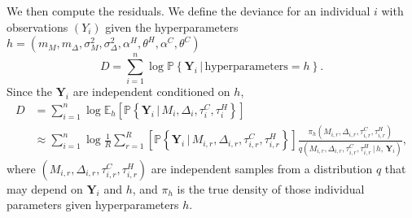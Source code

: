 \documentclass[
]{article}
\begin{document}
We then compute the residuals. We define the deviance for an individual \(i\) with observations \((Y_i)\)
given the hyperparameters \(h=(m_M,m_\Delta,\sigma^2_M,\sigma^2_\Delta,\alpha^H,\theta^H,\alpha^C,\theta^C)\)
\[
  D= \sum_{i=1}^n \log \mathbb{P}\left\{ \mathbf{Y}_{i}\,|\, \text{hyperparameters}=h\right\}.
\]
\newcommand{\wtb}{\widetilde\mathbf}
Since the \(\mathbf{Y}_i\) are independent conditioned on \(h\),
\begin{align*}
D&= \sum_{i=1}^n \log \mathbb{E}_h\left[ \mathbb{P}\left\{ \mathbf{Y}_i \, |\, M_i,\Delta_i,\tau_i^{C},\tau_i^H \right\} \right]\\
    &\approx \sum_{i=1}^n \log \frac1R\sum_{r=1}^R \left[ \mathbb{P}\left\{ \mathbf{Y}_i \, |\, M_{i,r},\Delta_{i,r},\tau_{i,r}^{C},\tau_{i,r}^{H} \right\}\right] \frac{\pi_h(M_{i,r},\Delta_{i,r},\tau_{i,r}^{C},\tau_{i,r}^{H} )}{q(M_{i,r},\Delta_{i,r},\tau_{i,r}^{C},\tau_{i,r}^{H} \, | \, h,\, \mathbf{Y}_i)},
\end{align*}
where \((M_{i,r},\Delta_{i,r},\tau_{i,r}^{C},\tau_{i,r}^{H})\) are independent samples from a distribution \(q\) that may depend
on \(\mathbf{Y}_i\) and \(h\), and \(\pi_h\) is the true density of those individual parameters given hyperparameters \(h\).
\end{document}
